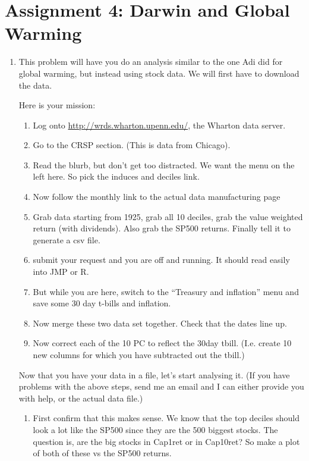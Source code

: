 \documentclass[11pt]{article}
\begin{document}
\section*{Assignment 4: Darwin and Global Warming}


\begin{enumerate}

\item This problem will have you do an analysis similar to the one Adi
did for global warming, but instead using stock data.  We will first
have to download the data.  

Here is your mission:
\begin{enumerate}[step 1:]
\item Log onto
\href{http://wrds.wharton.upenn.edu/}{http://wrds.wharton.upenn.edu/},
the Wharton data server.
\item Go to the CRSP section. (This is data from Chicago).
\item Read the blurb, but don't get too distracted.  We want the menu
on the left here.  So pick the induces and deciles link.
\item Now follow the monthly link to the actual data manufacturing page
\item Grab data starting from 1925, grab all 10 deciles, grab the
value weighted return (with dividends).  Also grab the SP500 returns.
Finally tell it to generate a csv file.
\item submit your request and you are off and running.  It should read
easily into JMP or R.
\item But while you are here, switch to the ``Treasury and inflation''
menu and save some 30 day t-bills and inflation.
\item Now merge these two data set together.  Check that the dates line up.
\item Now correct each of the 10 PC to reflect the 30day tbill.
(I.e. create 10 new columns for which you have subtracted out the tbill.)
\end{enumerate}
Now that you have your data in a file, let's start analysing it.  (If
you have problems with the above steps, send me an email and I can
either provide you with help, or the actual data file.)
\begin{enumerate}
\item First confirm that this makes sense.  We know that the top
deciles should look a lot like the SP500 since they are the 500 biggest
stocks.  The question is, are the big stocks in Cap1ret or in
Cap10ret?  So make a plot of both of these vs the SP500 returns.

\end{enumerate}
\end{enumerate}
\end{document}
